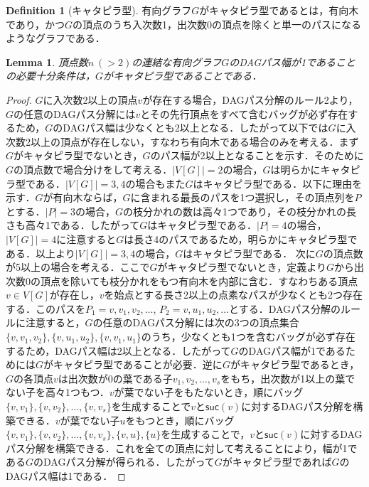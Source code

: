 \documentclass[master]{kuisthesis}		%
\theoremstyle{plain}
\newtheorem{lemma}{Lemma}
\theoremstyle{definition}
\newtheorem{definition*}{Definition}
\begin{document}
\begin{definition*}[キャタピラ型]
    有向グラフ$G$がキャタピラ型であるとは，有向木であり，かつ$G$の頂点のうち入次数1，出次数0の頂点を除くと単一のパスになるようなグラフである．
\end{definition*}


\begin{lemma}\label{catapillar}
    頂点数$n\ (>2)$の連結な有向グラフ$G$のDAGパス幅が1であることの必要十分条件は，$G$がキャタピラ型であることである．
\end{lemma}
    

\begin{proof}
    $G$に入次数2以上の頂点$v$が存在する場合，DAGパス分解のルール2より，$G$の任意のDAGパス分解には$v$とその先行頂点をすべて含むバッグが必ず存在するため，$G$のDAGパス幅は少なくとも2以上となる．したがって以下では$G$に入次数2以上の頂点が存在しない，すなわち有向木である場合のみを考える．まず$G$がキャタピラ型でないとき，$G$のパス幅が2以上となることを示す．そのために$G$の頂点数で場合分けをして考える．$|V[G]|=2$の場合，$G$は明らかにキャタピラ型である．$|V[G]|=3, 4$の場合もまた$G$はキャタピラ型である．以下に理由を示す．$G$が有向木ならば，$G$に含まれる最長のパスを1つ選択し，その頂点列を$P$とする．$|P|=3$の場合，$G$の枝分かれの数は高々1つであり，その枝分かれの長さも高々1である．したがって$G$はキャタピラ型である．$|P|=4$の場合，$|V[G]|=4$に注意すると$G$は長さ4のパスであるため，明らかにキャタピラ型である．以上より$|V[G]|=3, 4$の場合，$G$はキャタピラ型である．
    次に$G$の頂点数が5以上の場合を考える．ここで$G$がキャタピラ型でないとき，定義より$G$から出次数0の頂点を除いても枝分かれをもつ有向木を内部に含む．すなわちある頂点$v\in V[G]$が存在し，$v$を始点とする長さ2以上の点素なパスが少なくとも2つ存在する．このパスを$P_1 = v, v_1, v_2, \dots$, $P_2 = v, u_1, u_2, \dots$とする．DAGパス分解のルールに注意すると，$G$の任意のDAGパス分解には次の3つの頂点集合$\{v, v_1, v_2\}, \{v, u_1, u_2\}, \{v, v_1, u_1\}$のうち，少なくとも1つを含むバッグが必ず存在するため，DAGパス幅は2以上となる．したがって$G$のDAGパス幅が1であるためには$G$がキャタピラ型であることが必要．逆に$G$がキャタピラ型であるとき，$G$の各頂点$v$は出次数が0の葉である子$v_1, v_2, \dots, v_s$をもち，出次数が1以上の葉でない子を高々1つもつ．$v$が葉でない子をもたないとき，順にバッグ$\{v, v_1\}, \{v, v_2\}, \dots , \{v, v_s\}$を生成することで$v$と$\mathsf{suc}(v)$に対するDAGパス分解を構築できる．$v$が葉でない子$u$をもつとき，順にバッグ$\{v, v_1\}, \{v, v_2\}, \dots , \{v, v_s\}, \{v, u\}, \{u\}$を生成することで，$v$と$\mathsf{suc}(v)$に対するDAGパス分解を構築できる．これを全ての頂点に対して考えることにより，幅が1である$G$のDAGパス分解が得られる．したがって$G$がキャタピラ型であれば$G$のDAGパス幅は1である．
\end{proof}
\end{document}

